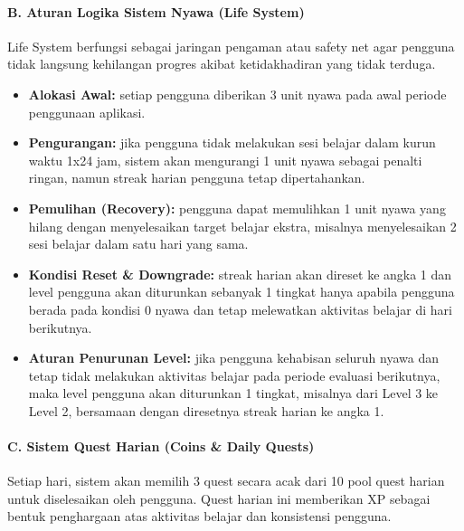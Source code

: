 \documentclass[11pt]{article}
\begin{document}
\paragraph{B. Aturan Logika Sistem Nyawa (Life System)}

Life System berfungsi sebagai jaringan pengaman atau safety net agar pengguna tidak langsung kehilangan progres akibat ketidakhadiran yang tidak terduga.

\begin{itemize}
    \item \textbf{Alokasi Awal:} setiap pengguna diberikan 3 unit nyawa pada awal periode penggunaan aplikasi.
    \item \textbf{Pengurangan:} jika pengguna tidak melakukan sesi belajar dalam kurun waktu 1x24 jam, sistem akan mengurangi 1 unit nyawa sebagai penalti ringan, namun streak harian pengguna tetap dipertahankan.
    \item \textbf{Pemulihan (Recovery):} pengguna dapat memulihkan 1 unit nyawa yang hilang dengan menyelesaikan target belajar ekstra, misalnya menyelesaikan 2 sesi belajar dalam satu hari yang sama.
    \item \textbf{Kondisi Reset \& Downgrade:} streak harian akan direset ke angka 1 dan level pengguna akan diturunkan sebanyak 1 tingkat hanya apabila pengguna berada pada kondisi 0 nyawa dan tetap melewatkan aktivitas belajar di hari berikutnya.
    \item \textbf{Aturan Penurunan Level:} jika pengguna kehabisan seluruh nyawa dan tetap tidak melakukan aktivitas belajar pada periode evaluasi berikutnya, maka level pengguna akan diturunkan 1 tingkat, misalnya dari Level 3 ke Level 2, bersamaan dengan diresetnya streak harian ke angka 1.
\end{itemize}

\paragraph{C. Sistem Quest Harian (Coins \& Daily Quests)}

Setiap hari, sistem akan memilih 3 quest secara acak dari 10 pool quest harian untuk diselesaikan oleh pengguna. Quest harian ini memberikan XP sebagai bentuk penghargaan atas aktivitas belajar dan konsistensi pengguna.
\end{document}
